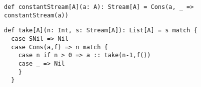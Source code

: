\documentclass[11pt]{article}
\begin{document}
\begin{verbatim}
def constantStream[A](a: A): Stream[A] = Cons(a, _ => constantStream(a))
\end{verbatim}

\begin{verbatim}
def take[A](n: Int, s: Stream[A]): List[A] = s match {
  case SNil => Nil
  case Cons(a,f) => n match {
    case n if n > 0 => a :: take(n-1,f())
    case _ => Nil
    }
  }
\end{verbatim}
\end{document}
